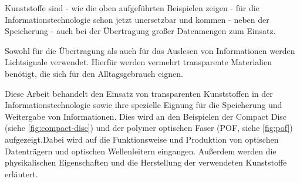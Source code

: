 Kunststoffe sind - wie die oben aufgeführten Beispielen zeigen - für die
Informationstechnologie schon jetzt unersetzbar und kommen - neben der
Speicherung - auch bei der Übertragung großer Datenmengen zum Einsatz.

Sowohl für die Übertragung als auch für das Auslesen von Informationen werden
Lichtsignale verwendet. Hierfür werden vermehrt transparente Materialien
benötigt, die sich für den Alltagsgebrauch eignen.

Diese Arbeit behandelt den Einsatz von transparenten Kunststoffen in der
Informationstechnologie sowie ihre spezielle Eignung für die Speicherung und
Weitergabe von Informationen. Dies wird an den Beispielen der Compact Disc
(siehe \autoref{fig:compact-disc}) und der polymer optischen Faser (POF,  siehe
\autoref{fig:pof}) aufgezeigt.Dabei wird auf die Funktionsweise und Produktion
von optischen Datenträgern und optischen Wellenleitern eingangen. Außerdem
werden die physikalischen Eigenschaften und die Herstellung der verwendeten
Kunststoffe erläutert.

